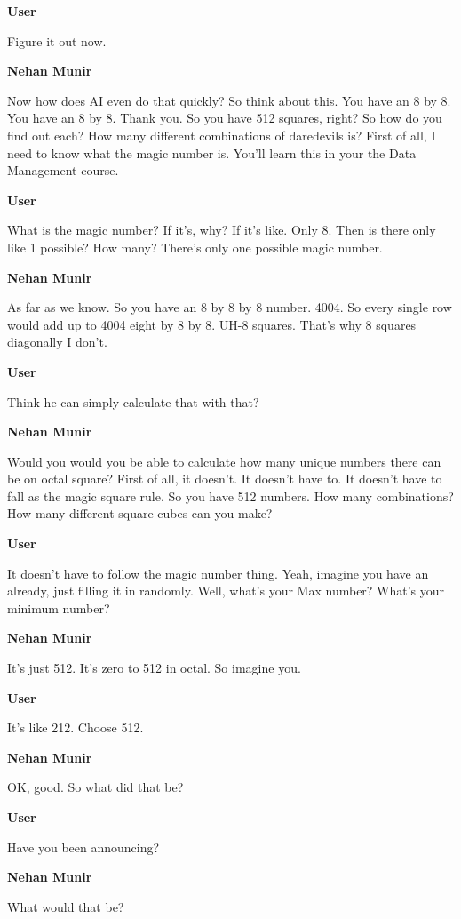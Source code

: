 \documentclass{article}
\begin{document}
\noindent \textbf{User}

Figure it out now.

\noindent \textbf{Nehan Munir}

Now how does AI even do that quickly? So think about this. You have an 8 by 8. You have an 8 by 8. Thank you. So you have 512 squares, right? So how do you find out each? How many different combinations of daredevils is? First of all, I need to know what the magic number is. You'll learn this in your the Data Management course.

\noindent \textbf{User}

What is the magic number? If it's, why? If it's like. Only 8. Then is there only like 1 possible? How many? There's only one possible magic number.

\noindent \textbf{Nehan Munir}

As far as we know. So you have an 8 by 8 by 8 number. 4004. So every single row would add up to 4004 eight by 8 by 8. UH-8 squares. That's why 8 squares diagonally I don't.

\noindent \textbf{User}

Think he can simply calculate that with that?

\noindent \textbf{Nehan Munir}

Would you would you be able to calculate how many unique numbers there can be on octal square? First of all, it doesn't. It doesn't have to. It doesn't have to fall as the magic square rule. So you have 512 numbers. How many combinations? How many different square cubes can you make?

\noindent \textbf{User}

It doesn't have to follow the magic number thing. Yeah, imagine you have an already, just filling it in randomly. Well, what's your Max number? What's your minimum number?

\noindent \textbf{Nehan Munir}

It's just 512. It's zero to 512 in octal. So imagine you.

\noindent \textbf{User}

It's like 212. Choose 512.

\noindent \textbf{Nehan Munir}

OK, good. So what did that be?

\noindent \textbf{User}

Have you been announcing?

\noindent \textbf{Nehan Munir}

What would that be?
\end{document}
